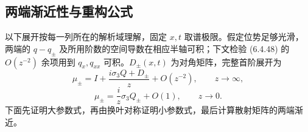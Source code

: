 \documentclass[lang=cn,scheme=chinese,mode=simple,device=normal,color=blue,
math=cm,thmcnt=section,12pt]{elegantbook}
\newcommand{\eqq}[2]{\tag{#1}\label{eq:#1}#2}
\begin{document}
\subsection{两端渐近性与重构公式}
以下展开按每一列所在的解析域理解，固定 $x,t$ 取谱极限。假定位势足够光滑，
两端的 $q-q_\pm$ 及所用阶数的空间导数在相应半轴可积；下文检验 (6.4.48) 的
$O(z^{-2})$ 余项用到 $q_x,q_{xx}$ 可积。$D_\pm(x,t)$ 为对角矩阵，完整首阶展开为
\begin{equation}\eqq{6.4.48}{\mu_\pm=I+\dfrac{i\sigma_3Q+D_\pm}{z}+O(z^{-2}),\qquad z\to\infty,}\end{equation}
\begin{equation}\eqq{6.4.49}{\mu_\pm=\dfrac{i}{z}\sigma_3Q_\pm+O(1),\qquad z\to0.}\end{equation}
下面先证明大参数式，再由换叶对称证明小参数式，最后计算散射矩阵的两端渐近。
\end{document}

